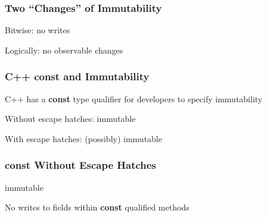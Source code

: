 \documentclass[aspectratio=169]{beamer}
\newcommand{\const}{{\color{blue} \bfseries \ttfamily const}}
\begin{document}
  \begin{frame}
    \frametitle{Two ``Changes'' of Immutability}
    \Large
    Bitwise: no writes
 
    \vspace{1em}
    Logically: no observable changes
  \end{frame}

  \begin{frame}
    \frametitle{C++ \const{} and Immutability}
    \Large
    C++ has a \const{} type qualifier for developers to specify immutability

    \vspace{1em}
    Without escape hatches:  immutable

    \vspace{1em}
    With escape hatches: (possibly)  immutable
  \end{frame}

  \begin{frame}
    \frametitle{\const{} Without Escape Hatches}
    \Large
     immutable

    \vspace{1em}
    No writes to fields within \const{} qualified methods

    \vspace{1em}
    \centering
  \end{frame}
\end{document}
